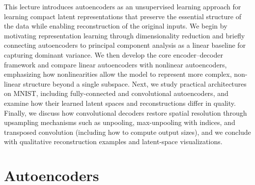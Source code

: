 \documentclass{article}
\begin{document}
This lecture introduces autoencoders as an unsupervised learning approach for learning compact latent representations that preserve the essential structure of the data while enabling reconstruction of the original inputs. We begin by motivating representation learning through dimensionality reduction and briefly connecting autoencoders to principal component analysis as a linear baseline for capturing dominant variance. We then develop the core encoder--decoder framework and compare linear autoencoders with nonlinear autoencoders, emphasizing how nonlinearities allow the model to represent more complex, non-linear structure beyond a single subspace. Next, we study practical architectures on MNIST, including fully-connected and convolutional autoencoders, and examine how their learned latent spaces and reconstructions differ in quality. Finally, we discuss how convolutional decoders restore spatial resolution through upsampling mechanisms such as unpooling, max-unpooling with indices, and transposed convolution (including how to compute output sizes), and we conclude with qualitative reconstruction examples and latent-space visualizations.

\section{Autoencoders} 
\end{document}
